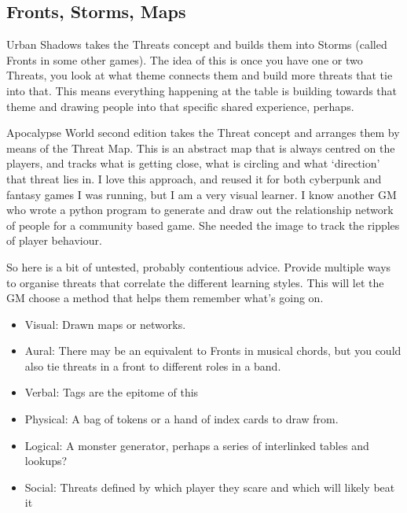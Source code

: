 \documentclass{tufte-handout}
\begin{document}
\subsection{Fronts, Storms, Maps}

Urban Shadows takes the Threats concept and builds them into Storms (called Fronts in some other games). The idea of this is once you have one or two Threats, you look at what theme connects them and build more threats that tie into that. This means everything happening at the table is building towards that theme and drawing people into that specific shared experience, perhaps.

Apocalypse World second edition takes the Threat concept and arranges them by means of the Threat Map. This is an abstract map that is always centred on the players, and tracks what is getting close, what is circling and what `direction' that threat lies in. I love this approach, and reused it for both cyberpunk and fantasy games I was running, but I am a very visual learner. I know another GM who wrote a python program to generate and draw out the relationship network of people for a community based game. She needed the image to track the ripples of player behaviour.

So here is a bit of untested, probably contentious advice. Provide multiple ways to organise threats that correlate the different learning styles. This will let the GM choose a method that helps them remember what's going on.

\begin{itemize}
\item Visual: Drawn maps or networks.
\item Aural: There may be an equivalent to Fronts in musical chords, but you could also tie threats in a front to different roles in a band.
\item Verbal: Tags are the epitome of this
\item Physical: A bag of tokens or a hand of index cards to draw from.
\item Logical: A monster generator, perhaps a series of interlinked tables and lookups? 
\item Social: Threats defined by which player they scare and which will likely beat it
\end{itemize}
\end{document}
